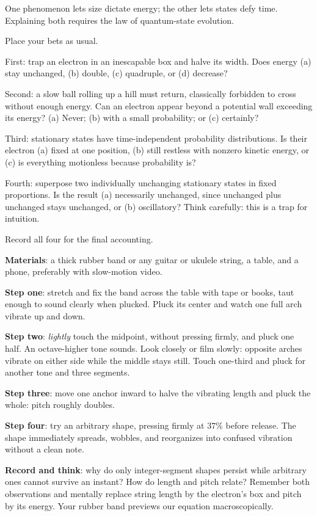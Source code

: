 One phenomenon lets size dictate energy; the other lets states defy time. Explaining both requires the law of quantum-state evolution.


Place your bets as usual.

First: trap an electron in an inescapable box and halve its width. Does energy (a) stay unchanged, (b) double, (c) quadruple, or (d) decrease?

Second: a slow ball rolling up a hill must return, classically forbidden to cross without enough energy. Can an electron appear beyond a potential wall exceeding its energy? (a) Never; (b) with a small probability; or (c) certainly?

Third: stationary states have time-independent probability distributions. Is their electron (a) fixed at one position, (b) still restless with nonzero kinetic energy, or (c) is everything motionless because probability is?

Fourth: superpose two individually unchanging stationary states in fixed proportions. Is the result (a) necessarily unchanged, since unchanged plus unchanged stays unchanged, or (b) oscillatory? Think carefully: this is a trap for intuition.

Record all four for the final accounting.


\begin{experiment}
\textbf{Materials}: a thick rubber band or any guitar or ukulele string, a table, and a phone, preferably with slow-motion video.

\textbf{Step one}: stretch and fix the band across the table with tape or books, taut enough to sound clearly when plucked. Pluck its center and watch one full arch vibrate up and down.

\textbf{Step two}: \emph{lightly} touch the midpoint, without pressing firmly, and pluck one half. An octave-higher tone sounds. Look closely or film slowly: opposite arches vibrate on either side while the middle stays still. Touch one-third and pluck for another tone and three segments.

\textbf{Step three}: move one anchor inward to halve the vibrating length and pluck the whole: pitch roughly doubles.

\textbf{Step four}: try an arbitrary shape, pressing firmly at \(37\%\) before release. The shape immediately spreads, wobbles, and reorganizes into confused vibration without a clean note.

\textbf{Record and think}: why do only integer-segment shapes persist while arbitrary ones cannot survive an instant? How do length and pitch relate? Remember both observations and mentally replace string length by the electron's box and pitch by its energy. Your rubber band previews our equation macroscopically.
\end{experiment}

